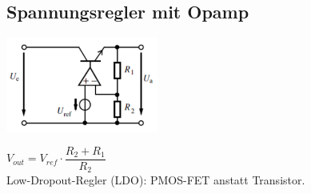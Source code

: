 \subsection{Spannungsregler mit Opamp}
	\begin{minipage}{200pt}
		\includegraphics[width = 5cm]{./images/spgregler/02_spgregler_opamp.png}
	\end{minipage}
	\begin{minipage}{300pt}
			$V_{out} = V_{ref}\cdot\dfrac{R_2+R_1}{R_2}$\\
			Low-Dropout-Regler (LDO): PMOS-FET anstatt Transistor.
	\end{minipage}\\




